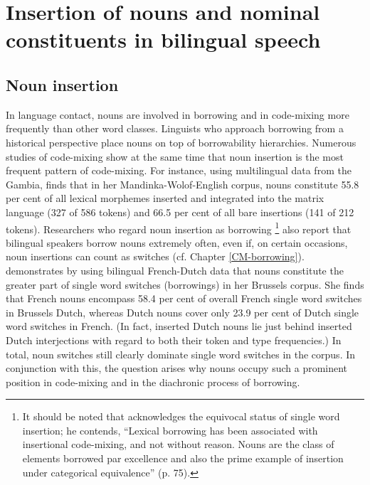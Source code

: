 \section{Insertion of nouns and nominal constituents in bilingual speech}
\subsection{Noun insertion}\label{noun-insertion}
In language contact, nouns are involved in borrowing and in code-mixing more frequently than other word classes. Linguists who approach borrowing from a historical perspective \citep{whitney-1881, moravcsik, thomason-kaufman, matras2009} place nouns on top of borrowability hierarchies. Numerous studies of code-mixing show at the same time that noun insertion is the most frequent pattern of code-mixing. For instance, using multilingual data from the Gambia, \citet[112, 107]{haust-codeswitching-1995} finds that in her Mandinka-Wolof-English corpus, nouns constitute 55.8 per cent of all lexical morphemes inserted and integrated into the matrix language (327 of 586 tokens) and 66.5 per cent of all bare insertions (141 of 212 tokens). Researchers who regard noun insertion as borrowing \citep{poplack-etal-1988, sankoff-et-al-1990, van-hout-muysken, muysken-bilingual-2000}\footnote{It should be noted that \citet{muysken-bilingual-2000} acknowledges the equivocal status of single word insertion; he contends, ``Lexical borrowing has been associated with insertional code-mixing, and not without reason. Nouns are the class of elements borrowed par excellence and also the prime example of insertion under categorical equivalence'' (p. 75).} 
also report that bilingual speakers borrow nouns extremely often, even if, on certain occasions, noun insertions can count as switches (cf. Chapter \ref{CM-borrowing}). \citet[99--100]{treffers-daller-mixing-1994} demonstrates by using bilingual French-Dutch data that nouns constitute the greater part of single word switches (borrowings) in her Brussels corpus. She finds that French nouns encompass 58.4 per cent of overall French single word switches in Brussels Dutch, whereas Dutch nouns cover only 23.9 per cent of Dutch single word switches in French. (In fact, inserted Dutch nouns lie just behind inserted Dutch interjections with regard to both their token and type frequencies.) In total, noun switches still clearly dominate single word switches in the corpus. In conjunction with this, the question arises why nouns occupy such a prominent position in code-mixing and in the diachronic process of borrowing. 

